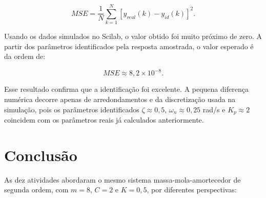 \documentclass[12pt,a4paper]{article}
\begin{document}
\begin{equation}
  MSE=\frac{1}{N}\sum_{k=1}^{N}\left[y_{real}(k)-y_{id}(k)\right]^2.
\end{equation}

Usando os dados simulados no Scilab, o valor obtido foi muito próximo de zero. A partir dos parâmetros identificados pela resposta amostrada, o valor esperado é da ordem de:

\begin{equation}
  MSE\approx8{,}2\times10^{-8}.
\end{equation}

Esse resultado confirma que a identificação foi excelente. A pequena diferença numérica decorre apenas de arredondamentos e da discretização usada na simulação, pois os parâmetros identificados $\zeta\approx0{,}5$, $\omega_n\approx0{,}25$ rad/s e $K_p\approx2$ coincidem com os parâmetros reais já calculados anteriormente.

\section{Conclusão}

As dez atividades abordaram o mesmo sistema massa-mola-amortecedor de segunda ordem, com $m=8$, $C=2$ e $K=0{,}5$, por diferentes perspectivas:
\end{document}
